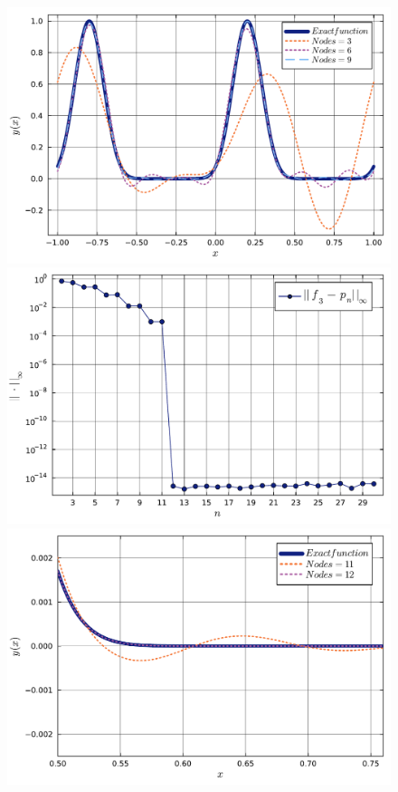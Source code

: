 \documentclass[letterpaper, 12pt]{article}
\numberwithin{equation}{section}    %
\begin{document}
\begin{figure}[!ht]
    \centering
    \begin{minipage}[b]{0.40\textwidth}
        \includegraphics[width=\textwidth]{4615.pdf}
    \end{minipage}
    \hspace{0.5cm}
    \begin{minipage}[b]{0.40\textwidth}
        \includegraphics[width=\textwidth]{4616.pdf}
    \end{minipage}
    \begin{minipage}[b]{0.40\textwidth}
        \includegraphics[width=\textwidth]{4617.pdf}

\end{minipage}
\end{figure}
\end{document}
